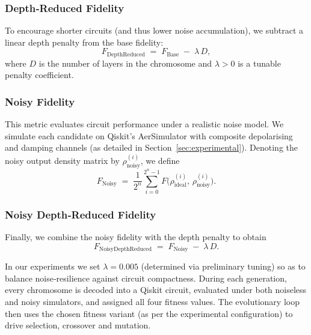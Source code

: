 \documentclass[11pt,a4paper]{article}
\begin{document}
\subsubsection*{Depth‐Reduced Fidelity}
To encourage shorter circuits (and thus lower noise accumulation), we subtract a linear depth penalty from the base fidelity:
\begin{equation}
  F_{\mathrm{DepthReduced}}
  \;=\;F_{\mathrm{Base}}\;-\;\lambda\,D,
\end{equation}
where $D$ is the number of layers in the chromosome and $\lambda>0$ is a tunable penalty coefficient.

\subsubsection*{Noisy Fidelity}
This metric evaluates circuit performance under a realistic noise model.  We simulate each candidate on Qiskit’s AerSimulator with composite depolarising and damping channels (as detailed in Section~\ref{sec:experimental}).  Denoting the noisy output density matrix by $\rho_{\mathrm{noisy}}^{(i)}$, we define
\begin{equation}
  F_{\mathrm{Noisy}}
  \;=\;\frac{1}{2^n}\sum_{i=0}^{2^n-1}
    F\bigl(\rho_{\mathrm{ideal}}^{(i)},\,\rho_{\mathrm{noisy}}^{(i)}\bigr).
\end{equation}

\subsubsection*{Noisy Depth‐Reduced Fidelity}

Finally, we combine the noisy fidelity with the depth penalty to obtain
\begin{equation}
  F_{\mathrm{NoisyDepthReduced}}
  \;=\;F_{\mathrm{Noisy}}\;-\;\lambda\,D.
\end{equation}

In our experiments we set $\lambda=0.005$ (determined via preliminary tuning) so as to balance noise‑resilience against circuit compactness.  During each generation, every chromosome is decoded into a Qiskit circuit, evaluated under both noiseless and noisy simulators, and assigned all four fitness values.  The evolutionary loop then uses the chosen fitness variant (as per the experimental configuration) to drive selection, crossover and mutation.

%
%
\end{document}
